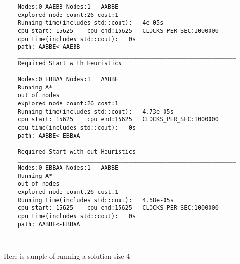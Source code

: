 \documentclass[12pt]{article}
\begin{document}
\begin{lstlisting}
	Nodes:0	AAEBB Nodes:1	AABBE
	explored node count:26 cost:1
	Running time(includes std::cout):	4e-05s
	cpu start: 15625	cpu end:15625	CLOCKS_PER_SEC:1000000
	cpu time(includes std::cout):	0s
	path: AABBE<-AAEBB
	_______________________________________________________________
	Required Start with Heuristics
	_______________________________________________________________
	Nodes:0	EBBAA Nodes:1	AABBE
	Running A*
	out of nodes
	explored node count:26 cost:1
	Running time(includes std::cout):	4.73e-05s
	cpu start: 15625	cpu end:15625	CLOCKS_PER_SEC:1000000
	cpu time(includes std::cout):	0s
	path: AABBE<-EBBAA
	_______________________________________________________________
	Required Start with out Heuristics
	_______________________________________________________________
	Nodes:0	EBBAA Nodes:1	AABBE
	Running A*
	out of nodes
	explored node count:26 cost:1
	Running time(includes std::cout):	4.68e-05s
	cpu start: 15625	cpu end:15625	CLOCKS_PER_SEC:1000000
	cpu time(includes std::cout):	0s
	path: AABBE<-EBBAA
	_______________________________________________________________


\end{lstlisting}
Here is sample of running a solution size 4
\end{document}
